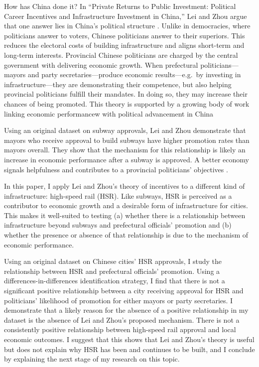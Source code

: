 \documentclass[12pt, ]{article}
\begin{document}
How has China done it? In ``Private Returns to Public Investment:
Political Career Incentives and Infrastructure Investment in China,''
Lei and Zhou argue that one answer lies in China's political structure
\citep{lei_private_2022}. Unlike in democracies, where politicians
answer to voters, Chinese politicians answer to their superiors. This
reduces the electoral costs of building infrastructure and aligns
short-term and long-term interests. Provincial Chinese politicians are
charged by the central government with delivering economic growth. When
prefectural politicians---mayors and party secretaries---produce
economic results---e.g.~by investing in infrastructure---they are
demonstrating their competence, but also helping provincial politicians
fulfill their mandates. In doing so, they may increase their chances of
being promoted. This theory is supported by a growing body of work
linking economic performancew with political advancement in China
\citep{luo_chinas_2021, landry_does_2018}

Using an original dataset on subway approvals, Lei and Zhou demonstrate
that mayors who receive approval to build subways have higher promotion
rates than mayors overall. They show that the mechanism for this
relationship is likely an increase in economic performance after a
subway is approved. A better economy signals helpfulness and contributes
to a provincial politicians' objectives \citep{lei_private_2022}.

In this paper, I apply Lei and Zhou's theory of incentives to a
different kind of infrastructure: high-speed rail (HSR). Like subways,
HSR is perceived as a contributor to economic growth and a desirable
form of infrastructure for cities. This makes it well-suited to testing
(a) whether there is a relationship between infrastructure beyond
subways and prefectural officials' promotion and (b) whether the
presence or absence of that relationship is due to the mechanism of
economic performance.

Using an original dataset on Chinese cities' HSR approvals, I study the
relationship between HSR and prefectural officials' promotion. Using a
differences-in-differences identification strategy, I find that there is
not a significant positive relationship between a city receiving
approval for HSR and politicians' likelihood of promotion for either
mayors or party secretaries. I demonstrate that a likely reason for the
absence of a positive relationship in my dataset is the absence of Lei
and Zhou's proposed mechanism. There is not a consistently positive
relationship between high-speed rail approval and local economic
outcomes. I suggest that this shows that Lei and Zhou's theory is useful
but does not explain why HSR has been and continues to be built, and I
conclude by explaining the next stage of my research on this topic.
\end{document}
